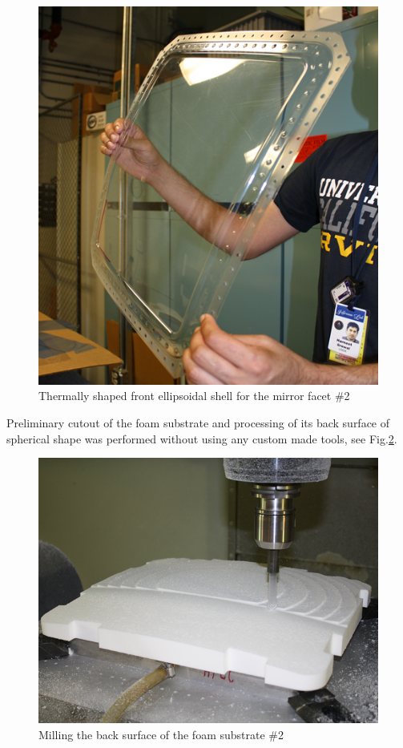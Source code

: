 \begin{figure}[h]
    \centering
    \includegraphics[width=0.90\linewidth]{images/Front_Shell.png}
    \caption{Thermally shaped front ellipsoidal shell for the mirror facet \#2}
    \label{fig:Shell}
\end{figure}

Preliminary cutout of the foam substrate and processing of its back surface of spherical shape was performed without using any custom made tools, see Fig.\ref{fig:Cut_Substr}.
\begin{figure}[h]
    \centering
    \includegraphics[width=0.9\linewidth]{images/Cut_Substr.png}
    \caption{Milling the back surface of the foam substrate \#2}
    \label{fig:Cut_Substr}
\end{figure}

